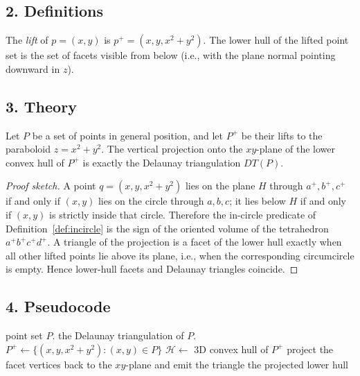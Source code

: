 \subsection{2. Definitions}

\begin{definition}\label{def:lifted_point}
The \emph{lift} of $p = (x,y)$ is $p^+ = (x, y, x^2 + y^2)$. The lower hull of
the lifted point set is the set of facets visible from below (i.e., with the
plane normal pointing downward in $z$).
\end{definition}

\subsection{3. Theory}

\begin{theorem}\label{thm:lifting}
Let $P$ be a set of points in general position, and let $P^+$ be their lifts to
the paraboloid $z = x^2 + y^2$. The vertical projection onto the $xy$-plane of
the lower convex hull of $P^+$ is exactly the Delaunay triangulation $DT(P)$.
\end{theorem}

\begin{proof}[Proof sketch]
A point $q = (x, y, x^2 + y^2)$ lies on the plane $H$ through $a^+, b^+, c^+$
if and only if $(x,y)$ lies on the circle through $a,b,c$; it lies below $H$ if
and only if $(x,y)$ is strictly inside that circle. Therefore the in-circle
predicate of Definition~\ref{def:incircle} is the sign of the oriented volume
of the tetrahedron $a^+b^+c^+d^+$. A triangle of the projection is a facet of
the lower hull exactly when all other lifted points lie above its plane, i.e.,
when the corresponding circumcircle is empty. Hence lower-hull facets and
Delaunay triangles coincide.
\end{proof}

\subsection{4. Pseudocode}

\begin{algorithm}[htbp]
\caption{Delaunay via Lifting}
\label{alg:delaunay_lifting}
\begin{algorithmic}[1]
\Require point set $P$.
\Ensure the Delaunay triangulation of $P$.
  \State $P^+ \gets \{ (x, y, x^2 + y^2) : (x,y) \in P \}$
  \State $\mathcal{H} \gets $ 3D convex hull of $P^+$
    \State project the facet vertices back to the $xy$-plane and emit the triangle
  \EndFor
  \State \Return the projected lower hull
\EndFunction
\end{algorithmic}
\end{algorithm}

